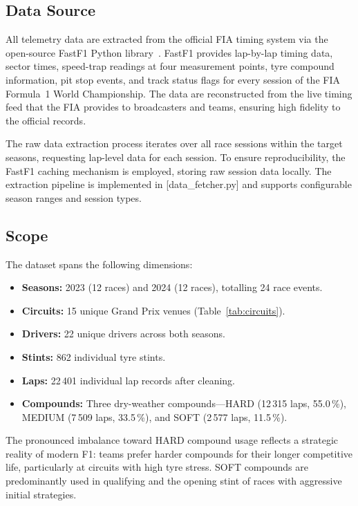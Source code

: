 \documentclass[journal,twoside]{IEEEtran}
\begin{document}
\subsection{Data Source}

All telemetry data are extracted from the official FIA timing system via
the open-source FastF1 Python library~\cite{fastf1}.  FastF1 provides
lap-by-lap timing data, sector times, speed-trap readings at four
measurement points, tyre compound information, pit stop events, and
track status flags for every session of the FIA Formula~1 World
Championship.  The data are reconstructed from the live timing feed
that the FIA provides to broadcasters and teams, ensuring high
fidelity to the official records.

The raw data extraction process iterates over all race sessions within
the target seasons, requesting lap-level data for each session.  To
ensure reproducibility, the FastF1 caching mechanism is employed,
storing raw session data locally.  The extraction pipeline is
implemented in [data\_fetcher.py] and supports configurable season
ranges and session types.

\subsection{Scope}

The dataset spans the following dimensions:

\begin{itemize}[noitemsep]
  \item \textbf{Seasons:} 2023 (12 races) and 2024 (12 races), totalling 24 race events.
  \item \textbf{Circuits:} 15 unique Grand Prix venues (Table~\ref{tab:circuits}).
  \item \textbf{Drivers:} 22 unique drivers across both seasons.
  \item \textbf{Stints:} 862 individual tyre stints.
  \item \textbf{Laps:} 22\,401 individual lap records after cleaning.
  \item \textbf{Compounds:} Three dry-weather compounds---HARD (12\,315
        laps, 55.0\,\%), MEDIUM (7\,509 laps, 33.5\,\%), and SOFT
        (2\,577 laps, 11.5\,\%).
\end{itemize}

The pronounced imbalance toward HARD compound usage reflects a
strategic reality of modern F1: teams prefer harder compounds for
their longer competitive life, particularly at circuits with high
tyre stress.  SOFT compounds are predominantly used in qualifying and
the opening stint of races with aggressive initial strategies.
\end{document}
